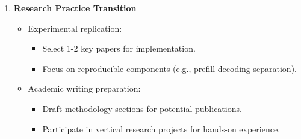 \documentclass[conference]{IEEEtran}
\begin{document}
\begin{enumerate}[leftmargin=*,noitemsep]
    \item \textbf{Research Practice Transition}
    \begin{itemize}[leftmargin=*]
        \item Experimental replication:
        \begin{itemize}[leftmargin=*]
            \item Select 1-2 key papers for implementation.
            \item Focus on reproducible components (e.g., prefill-decoding separation).
        \end{itemize}
        \item Academic writing preparation:
        \begin{itemize}[leftmargin=*]
            \item Draft methodology sections for potential publications.
            \item Participate in vertical research projects for hands-on experience.
        \end{itemize}
    \end{itemize}
\end{enumerate}
\end{document}
